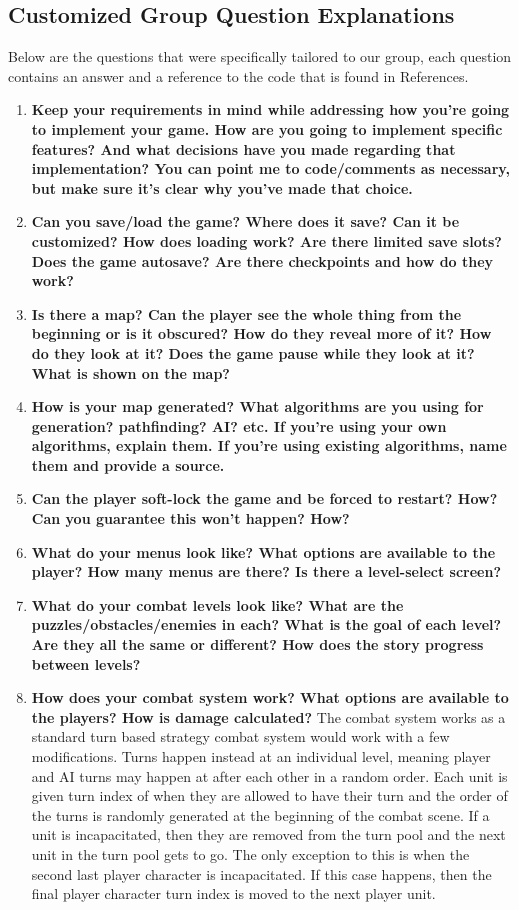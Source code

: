 \documentclass[12pt, titlepage]{article}
\begin{document}
\subsection{Customized Group Question Explanations}
\quad Below are the questions that were specifically tailored to our group, each question contains an answer and a reference to the code that is found in References.
\begin{enumerate}
	\item \textbf{Keep your requirements in mind while addressing how you're going to implement your game. How are you going to implement specific features? And what decisions have you made regarding that implementation? You can point me to code/comments as necessary, but make sure it's clear why you've made that choice.}
	\item \textbf{Can you save/load the game? Where does it save? Can it be customized? How does loading work? Are there limited save slots? Does the game autosave? Are there checkpoints and how do they work?}
	\item \textbf{Is there a map? Can the player see the whole thing from the beginning or is it obscured? How do they reveal more of it? How do they look at it? Does the game pause while they look at it? What is shown on the map?}
	\item \textbf{How is your map generated? What algorithms are you using for generation? pathfinding? AI? etc. If you're using your own algorithms, explain them. If you're using existing algorithms, name them and provide a source.}
	\item \textbf{Can the player soft-lock the game and be forced to restart? How? Can you guarantee this won't happen? How?}
	\item \textbf{What do your menus look like? What options are available to the player? How many menus are there? Is there a level-select screen?}
	\item \textbf{What do your combat levels look like? What are the puzzles/obstacles/enemies in each? What is the goal of each level? Are they all the same or different? How does the story progress between levels?}
	\item \textbf{How does your combat system work? What options are available to the players? How is damage calculated?}
	The combat system works as a standard turn based strategy combat system would work with a few modifications. Turns happen instead at an individual level, meaning player and AI turns may happen at after each other in a random order. Each unit is given turn index of when they are allowed to have their turn and the order of the turns is randomly generated at the beginning of the combat scene. If a unit is incapacitated, then they are removed from the turn pool and the next unit in the turn pool gets to go. The only exception to this is when the second last player character is incapacitated. If this case happens, then the final player character turn index is moved to the next player unit.
	

\end{enumerate}
\end{document}
